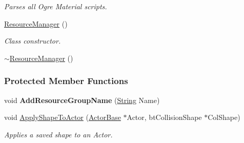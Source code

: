 \begin{DoxyCompactItemize}
\begin{DoxyCompactList}\small\item\em Parses all Ogre Material scripts. \item\end{DoxyCompactList}\item 
\hyperlink{classphys_1_1ResourceManager_af114d84fa357432db4184bfd322495b6}{ResourceManager} ()
\begin{DoxyCompactList}\small\item\em Class constructor. \item\end{DoxyCompactList}\item 
\hyperlink{classphys_1_1ResourceManager_a426d4d684a9ecf98359362243ce01072}{$\sim$ResourceManager} ()
\end{DoxyCompactItemize}
\subsubsection*{Protected Member Functions}
\begin{DoxyCompactItemize}
\item 
\hypertarget{classphys_1_1ResourceManager_a7c84034fc45e64fc3a07f736230afd38}{
void {\bfseries AddResourceGroupName} (\hyperlink{namespacephys_aa03900411993de7fbfec4789bc1d392e}{String} Name)}
\label{classphys_1_1ResourceManager_a7c84034fc45e64fc3a07f736230afd38}

\item 
\hypertarget{classphys_1_1ResourceManager_a1823d2d08fc3b6052ed893896eef6291}{
void \hyperlink{classphys_1_1ResourceManager_a1823d2d08fc3b6052ed893896eef6291}{ApplyShapeToActor} (\hyperlink{classphys_1_1ActorBase}{ActorBase} $\ast$Actor, btCollisionShape $\ast$ColShape)}
\label{classphys_1_1ResourceManager_a1823d2d08fc3b6052ed893896eef6291}

\begin{DoxyCompactList}\small\item\em Applies a saved shape to an Actor. \item\end{DoxyCompactList}\end{DoxyCompactItemize}
